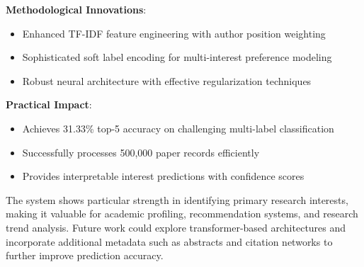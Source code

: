\documentclass[preprint,12pt]{elsarticle}
\begin{document}
\textbf{Methodological Innovations}:
\begin{itemize}
    \item Enhanced TF-IDF feature engineering with author position weighting
    \item Sophisticated soft label encoding for multi-interest preference modeling
    \item Robust neural architecture with effective regularization techniques
\end{itemize}

\textbf{Practical Impact}:
\begin{itemize}
    \item Achieves 31.33\% top-5 accuracy on challenging multi-label classification
    \item Successfully processes 500,000 paper records efficiently
    \item Provides interpretable interest predictions with confidence scores
\end{itemize}

The system shows particular strength in identifying primary research interests, making it valuable for academic profiling, recommendation systems, and research trend analysis. Future work could explore transformer-based architectures and incorporate additional metadata such as abstracts and citation networks to further improve prediction accuracy.



\end{document}
